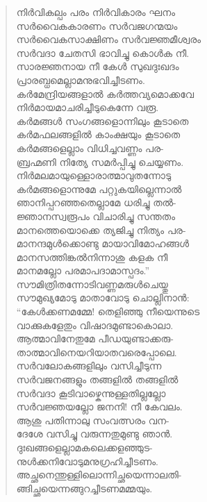 \begin{verse}
നിര്‍വികല്പം പരം നിര്‍വികാരം ഘനം\\
സര്‍വൈകകാരണം സര്‍വജഗന്മയം\\
സര്‍വൈകസാക്ഷിണം സര്‍വജ്ഞമീശ്വരം\\
സര്‍വദാ ചേതസി ഭാവിച്ചു കൊള്‍ക നീ.\\
സാരജ്ഞനായ നീ കേള്‍ സുഖദുഃഖദം\\
പ്രാരബ്ധമെല്ലാമനുഭവിച്ചീടണം.\\
കര്‍മേന്ദ്രിയങ്ങളാല്‍ കര്‍ത്തവ്യമൊക്കവേ\\
നിര്‍മായമാചരിച്ചീടുകെന്നേ വരൂ.\\
കര്‍മങ്ങള്‍ സംഗങ്ങളൊന്നിലും കൂടാതെ\\
കര്‍മഫലങ്ങളില്‍ കാംക്ഷയും കൂടാതെ\\
കര്‍മങ്ങളെല്ലാം വിധിച്ചവണ്ണം പര-\\
ബ്രഹ്മണി നിത്യേ സമര്‍പ്പിച്ചു ചെയ്യണം.\\
നിര്‍മലമായുള്ളൊരാത്മാവുതന്നോടു\\
കര്‍മങ്ങളൊന്നുമേ പറ്റുകയില്ലെന്നാല്‍\\
ഞാനിപ്പറഞ്ഞതെല്ലാമേ ധരിച്ചു തല്‍-\\
ജ്ഞാനസ്വരൂപം വിചാരിച്ചു സന്തതം\\
മാനത്തെയൊക്കെ ത്യജിച്ചു നിത്യം പര-\\
മാനന്ദമുള്‍ക്കൊണ്ടു മായാവിമോഹങ്ങള്‍\\
മാനസത്തിങ്കല്‍നിന്നാശു കളക നീ\\
മാനമല്ലോ പരമാപദാമാസ്പദം.”\\
സൗമിത്രിതന്നോടിവണ്ണമരുള്‍ചെയ്തു\\
സൗമുഖ്യമോടു മാതാവോടു ചൊല്ലിനാന്‍:\\
“കേള്‍ക്കണമമ്മേ! തെളിഞ്ഞു നീയെന്നുടെ\\
വാക്കുകളേതും വിഷാദമുണ്ടാകൊലാ.\\
ആത്മാവിനേതുമേ പീഡയുണ്ടാക്കരു-\\
താത്മാവിനെയറിയാതവരെപ്പോലെ.\\
സര്‍വലോകങ്ങളിലും വസിച്ചീടുന്ന\\
സര്‍വജനങ്ങളും തങ്ങളില്‍ തങ്ങളില്‍\\
സര്‍വദാ കൂടിവാഴ്കെന്നുള്ളതില്ലല്ലോ\\
സര്‍വജ്ഞയല്ലോ ജനനി! നീ കേവലം.\\
ആശു പതിന്നാലു സംവത്സരം വന-\\
ദേശേ വസിച്ചു വരുന്നതുമുണ്ടു ഞാന്‍.\\
ദുഃഖങ്ങളെല്ലാമകലെക്കളഞ്ഞുട-\\
നുള്‍ക്കനിവോടുമനുഗ്രഹിച്ചീടണം.\\
അച്ഛനെന്തുള്ളിലൊന്നിച്ഛയെന്നാലതി-\\
ങ്ങിച്ഛയെന്നങ്ങുറച്ചീടണമമ്മയും.\\

\end{verse}
